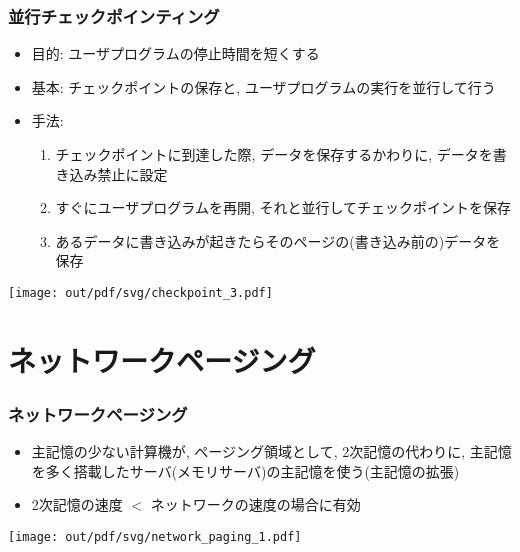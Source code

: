 \documentclass[12pt,dvipdfmx]{beamer}
\begin{document}
\begin{frame}
  \frametitle{並行チェックポインティング}
  \begin{itemize}
  \item 目的: ユーザプログラムの停止時間を短くする
  \item 基本: チェックポイントの保存と, ユーザプログラムの実行を並行して行う
  \item 手法:
    \begin{enumerate}
    \item チェックポイントに到達した際, データを保存するかわりに, データを書き込み禁止に設定
    \item すぐにユーザプログラムを再開, それと並行してチェックポイントを保存
    \item あるデータに書き込みが起きたらそのページの(書き込み前の)データを保存
    \end{enumerate}
  \end{itemize}
  \begin{center}
    \texttt{[image: out/pdf/svg/checkpoint\_3.pdf]}
  \end{center}
\end{frame}

\section{ネットワークページング}

\begin{frame}
  \frametitle{ネットワークページング}
  \begin{itemize}
  \item 主記憶の少ない計算機が, ページング領域として, 2次記憶の代わりに,
    主記憶を多く搭載したサーバ(メモリサーバ)の主記憶を使う(主記憶の拡張)

  \item 2次記憶の速度 $<$ ネットワークの速度の場合に有効
  \end{itemize}

    \begin{center}
\texttt{[image: out/pdf/svg/network\_paging\_1.pdf]}      
    \end{center}
    

\end{frame}
\end{document}
